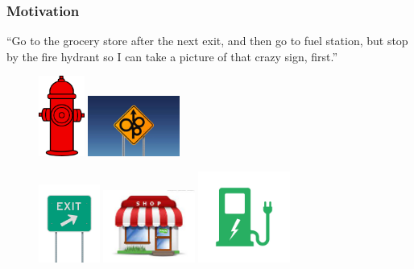 \documentclass{beamer}
\begin{document}
\begin{frame}
\frametitle{Motivation}

\begin{exampleblock}{}

  ``Go to the grocery store after the next exit, and then go to fuel station,
but stop by the fire hydrant so I can take a picture of that crazy sign,
first.''

\end{exampleblock}
\pause
\begin{figure}
\hspace*{-3mm}%
\centering
   \pause
   \includegraphics[width=1.5cm]{pics/hydrant.png}
   \pause
   \includegraphics[width=3cm]{pics/crazy.jpg}
\end{figure}
\pause
\begin{figure}
\hspace*{-3mm}%
\centering
   \includegraphics[width=2cm]{pics/exit.jpg}
   \pause
   \includegraphics[width=3cm]{pics/shop.jpeg}
   \pause
   \includegraphics[width=3cm]{pics/charge.jpg}
\end{figure}
  
\end{frame}
\end{document}
